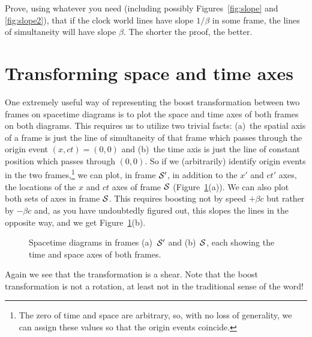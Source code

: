 \begin{problem}
Prove, using whatever you need (including possibly
Figures~\ref{fig:slope} and \ref{fig:slope2}), that if the clock world
lines have slope $1/\beta$ in some frame, the lines of simultaneity
will have slope $\beta$.  The shorter the proof, the better.
\end{problem}


\section{Transforming space and time axes}
\label{sec:txaxes}

One extremely useful way of representing the boost transformation
between two frames on spacetime diagrams is to plot the space and time
axes of both frames on both diagrams.  This requires us to utilize two
trivial facts: (a)~the spatial axis of a frame is just the line of
simultaneity of that frame which passes through the origin event
$(x,ct)=(0,0)$ and (b)~the time axis is just the line of constant
position which passes through $(0,0)$.  So if we (arbitrarily)
identify origin events in the two frames,\footnote{The zero of time
and space are arbitrary, so, with no loss of generality, we can assign
these values so that the origin events coincide.} we can plot, in
frame $\cal S'$, in addition to the $x'$ and $ct'$ axes, the
locations of the $x$ and $ct$ axes of frame $\cal S$
(Figure~\ref{fig:bothaxes}(a)).  We can also plot both sets of axes in
frame $\cal S$.  This requires boosting not by speed $+\beta c$ but
rather by $-\beta c$ and, as you have undoubtedly figured out, this
slopes the lines in the opposite way, and we get
Figure~\ref{fig:bothaxes}(b).
\begin{figure}
\caption{Spacetime diagrams in frames (a)~$\cal S'$ and
(b)~$\cal S$, each showing the time and space axes of both frames.}
\label{fig:bothaxes}
\end{figure}
Again we see that the transformation is a shear.  Note that the boost
transformation is not a rotation, at least not in the traditional
sense of the word!

